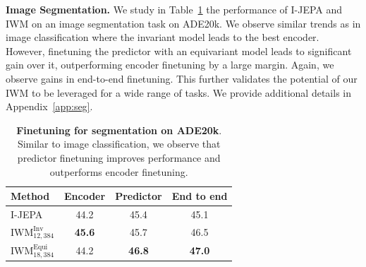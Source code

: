 \documentclass[twocolumn]{fairmeta}
\theoremstyle{plain}
\theoremstyle{definition}
\theoremstyle{remark}
\begin{document}
\begin{table}[!t]
\centering
    \caption{\fontsize{8.5pt}{8.5pt}\selectfont
    \textbf{Peak performance achieved from a single pretraining instance.} We compare ImageNet Top-1 accuracy with a frozen encoder or when allowing any evaluation head with any protocol, finetuning or not, with a predictor on top of the encoder or not.}
    \label{tab:results_peak}
\vspace{-1em}
\end{table}




\textbf{Image Segmentation.} We study in Table~\ref{fig:results-seg} the performance of I-JEPA and IWM on an image segmentation task on ADE20k. We observe similar trends as in image classification where the invariant model leads to the best encoder. However, finetuning the predictor with an equivariant model leads to significant gain over it, outperforming encoder finetuning by a large margin. Again, we observe gains in end-to-end finetuning. This further validates the potential of our IWM to be leveraged for a wide range of tasks. We provide additional details in Appendix~\ref{app:seg}.



\begin{table}[!t]
\centering
    \caption{\fontsize{8.5pt}{8.5pt}\selectfont
    \textbf{Finetuning for segmentation on ADE20k}. Similar to image classification, we observe that predictor finetuning improves performance and outperforms encoder finetuning.}
    \label{fig:results-seg}
\begin{tabular}{lccc}
\toprule
Method  & Encoder & Predictor & End to end \\
\midrule
I-JEPA &  44.2 & 45.4 & 45.1  \\
$\text{IWM}_{12,384}^\text{Inv}$  & \textbf{45.6} & 45.7  & 46.5 \\
$\text{IWM}_{18,384}^\text{Equi}$  &  44.2 & \textbf{46.8}  & \textbf{47.0}  \\

\bottomrule
\end{tabular}

\end{table}
\end{document}
